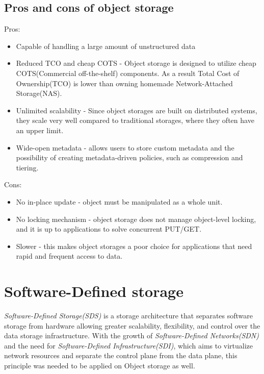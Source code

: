     \subsection*{Pros and cons of object storage}
    Pros:
    \begin{itemize}
        \item Capable of handling a large amount of unstructured data
        \item Reduced TCO and cheap COTS - Object storage is designed to utilize cheap COTS(Commercial off-the-shelf) components. As a result Total Cost of Ownership(TCO) is lower than owning homemade Network-Attached Storage(NAS)\cite{networkStorage}.
        \item Unlimited scalability - Since object storages are built on distributed systems, they scale very well compared to traditional storages, where they often have an upper limit\cite{swiftEssentials}.
        \item Wide-open metadata - allows users to store custom metadata and the possibility of creating metadata-driven policies, such as compression and tiering.
    \end{itemize}
    Cons:
    \begin{itemize}
        \item No in-place update - object must be manipulated as a whole unit.
        \item No locking mechanism - object storage does not manage object-level locking, and it is up to applications to solve concurrent PUT/GET.
        \item Slower - this makes object storages a poor choice for applications that need rapid and frequent access to data.
    \end{itemize}

\section{Software-Defined storage}
    \textit{Software-Defined Storage(SDS)} is a storage architecture that separates software storage from hardware allowing greater scalability, flexibility, and control over the data storage infrastructure. With the growth of \textit{Software-Defined Networks(SDN)} and the need for \textit{Software-Defined Infrastructure(SDI)}, which aims to virtualize network resources and separate the control plane from the data plane, this principle was needed to be applied on Object storage as well\cite{sdsSDSMultiTenantEnv}.

